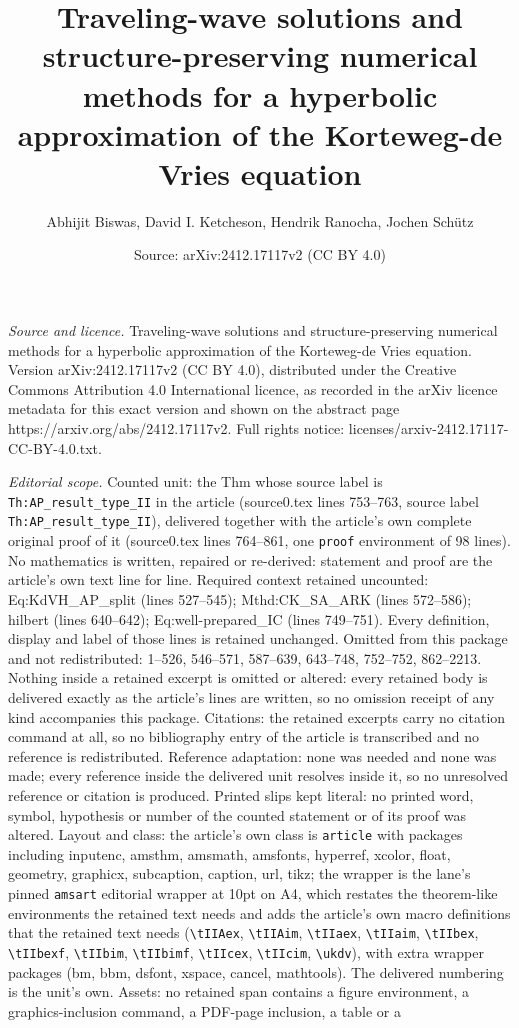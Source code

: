 \documentclass[10pt,a4paper]{amsart}
\title[Traveling-wave solutions and structure-preserving numerical ]{Traveling-wave solutions and structure-preserving numerical methods for a hyperbolic approximation of the Korteweg-de Vries equation}
\author{Abhijit Biswas, David I. Ketcheson, Hendrik Ranocha, Jochen Sch\"utz}
\date{Source: arXiv:2412.17117v2 (CC BY 4.0)}
\begin{document}
\maketitle

\noindent\emph{Source and licence.} Traveling-wave solutions and structure-preserving numerical methods for a hyperbolic approximation of the Korteweg-de Vries equation. Version arXiv:2412.17117v2 (CC BY 4.0), distributed under the Creative Commons Attribution 4.0 International licence, as recorded in the arXiv licence metadata for this exact version and shown on the abstract page https://arxiv.org/abs/2412.17117v2. Full rights notice: licenses/arxiv-2412.17117-CC-BY-4.0.txt.\par\smallskip

\noindent\textit{Editorial scope.} Counted unit: the Thm whose source label is \texttt{Th:AP\_result\_type\_II} in the article (source0.tex lines 753--763, source label \texttt{Th:AP\_result\_type\_II}), delivered together with the article's own complete original proof of it (source0.tex lines 764--861, one \texttt{proof} environment of 98 lines). No mathematics is written, repaired or re-derived: statement and proof are the article's own text line for line. Required context retained uncounted: Eq:KdVH\_AP\_split (lines 527--545); Mthd:CK\_SA\_ARK (lines 572--586); hilbert (lines 640--642); Eq:well-prepared\_IC (lines 749--751). Every definition, display and label of those lines is retained unchanged. Omitted from this package and not redistributed: 1--526, 546--571, 587--639, 643--748, 752--752, 862--2213. Nothing inside a retained excerpt is omitted or altered: every retained body is delivered exactly as the article's lines are written, so no omission receipt of any kind accompanies this package. Citations: the retained excerpts carry no citation command at all, so no bibliography entry of the article is transcribed and no reference is redistributed. Reference adaptation: none was needed and none was made; every reference inside the delivered unit resolves inside it, so no unresolved reference or citation is produced. Printed slips kept literal: no printed word, symbol, hypothesis or number of the counted statement or of its proof was altered. Layout and class: the article's own class is \texttt{article} with packages including inputenc, amsthm, amsmath, amsfonts, hyperref, xcolor, float, geometry, graphicx, subcaption, caption, url, tikz; the wrapper is the lane's pinned \texttt{amsart} editorial wrapper at 10pt on A4, which restates the theorem-like environments the retained text needs and adds the article's own macro definitions that the retained text needs (\texttt{\textbackslash tIIAex}, \texttt{\textbackslash tIIAim}, \texttt{\textbackslash tIIaex}, \texttt{\textbackslash tIIaim}, \texttt{\textbackslash tIIbex}, \texttt{\textbackslash tIIbexf}, \texttt{\textbackslash tIIbim}, \texttt{\textbackslash tIIbimf}, \texttt{\textbackslash tIIcex}, \texttt{\textbackslash tIIcim}, \texttt{\textbackslash ukdv}), with extra wrapper packages (bm, bbm, dsfont, xspace, cancel, mathtools). The delivered numbering is the unit's own. Assets: no retained span contains a figure environment, a graphics-inclusion command, a PDF-page inclusion, a table or a 
\end{document}
